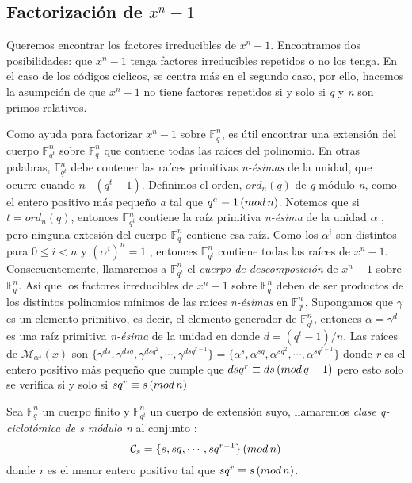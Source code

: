 \subsection{Factorización de $x^n-1$ }
Queremos encontrar los factores irreducibles de $x^n-1$. Encontramos dos posibilidades: que $x^n-1$ tenga factores irreducibles repetidos o no los tenga. En el caso de los códigos cíclicos, se centra más en el segundo caso, por ello, hacemos la asumpción de que $x^n-1$ no tiene factores repetidos si y solo si \textit{q} y \textit{n} son primos relativos.

Como ayuda para factorizar $x^n-1$ sobre $\mathbb{F}_q^n$, es útil encontrar una extensión del cuerpo $\mathbb{F}_{q^t}^n$ sobre $\mathbb{F}_q^n$ que contiene todas las raíces del polinomio. En otras palabras, $\mathbb{F}_{q^t}^n$ debe contener las raíces primitivas \textit{n-ésimas} de la unidad, que ocurre cuando $ n \mid (q^t-1)$.  Definimos el orden, $ord_n(q)$ de \textit{q} módulo \textit{n}, como el entero positivo más pequeño \textit{a} tal que $q^a \equiv 1 \thinspace ( mod \thinspace n)$. Notemos que si $t = ord_n(q)$, entonces $\mathbb{F}_{q^t}^n$ contiene la raíz primitiva \textit{n-ésima} de la unidad $\alpha$ , pero ninguna extesión del cuerpo $\mathbb{F}_q^n$ contiene esa raíz. Como los $\alpha^i$ son distintos para $0 \leq i < n $ y $(\alpha^i)^n = 1$ , entonces $\mathbb{F}_{q^t}^n$ contiene todas las raíces de $x^n-1$. Consecuentemente, llamaremos a $\mathbb{F}_{q^t}^n$ el \textit{cuerpo de descomposición} de $x^n-1$ sobre $\mathbb{F}_q^n$. Así que los factores irreducibles de $x^n-1$ sobre $\mathbb{F}_q^n$ deben de ser productos de los distintos polinomios mínimos de las raíces \textit{n-ésimas} en $\mathbb{F}_{q^t}^n$.  Supongamos que $\gamma$ es un elemento primitivo, es decir, el elemento generador de $\mathbb{F}_{q^t}^n$, entonces $\alpha = \gamma^d$ es una raíz primitiva \textit{n-ésima} de la unidad en donde $d = (q^t-1)/n$. Las raíces de $\mathcal{M}_{\alpha^s}(x)$ son $\{ \gamma^{ds}, \gamma^{dsq},\gamma^{dsq^2} ,\cdots, \gamma^{dsq^{r-1}} \} = \{ \alpha^s,\alpha^{sq},\alpha^{sq^2},\cdots,\alpha^{sq^{r-1}} \}$ donde \textit{r} es el entero positivo más pequeño que cumple que $dsq^r \equiv ds \thinspace ( mod \thinspace q-1 )$ pero esto solo se verifica si y solo si $sq^r \equiv s \thinspace ( mod \thinspace n )$

\begin{definition}
Sea $\mathbb{F}_q^n$ un cuerpo finito y $\mathbb{F}_{q^t}^n$ un cuerpo de extensión suyo, llamaremos \textit{clase q-ciclotómica de s módulo n} al conjunto :
\[
	\mathcal{C}_s = \{s,sq,\cdots,sq^{r-1} \} \thinspace (mod \thinspace n)
\]
donde \textit{r} es el menor entero positivo tal que $sq^r \equiv s \thinspace (mod \thinspace n ) $.
\end{definition}

